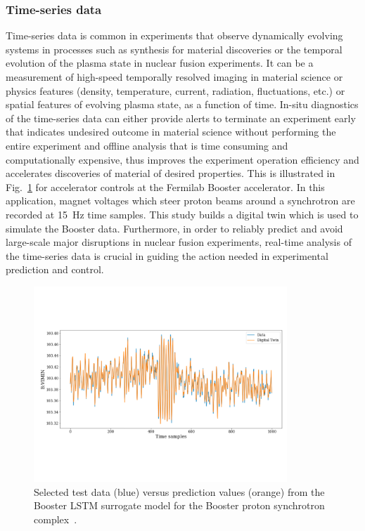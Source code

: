 \subsubsection{Time-series data}
Time-series data is common in experiments that observe dynamically evolving systems in processes such as synthesis for material discoveries or the temporal evolution of the plasma state in nuclear fusion experiments. It can be a measurement of high-speed temporally resolved imaging in material science or physics features (density, temperature, current, radiation, fluctuations, etc.) or spatial features of evolving plasma state, as a function of time. In-situ diagnostics of the time-series data can either provide alerts to terminate an experiment early that indicates undesired outcome in material science without performing the entire experiment and offline analysis that is time consuming and computationally expensive, thus improves the experiment operation efficiency and accelerates discoveries of material of desired properties. This is illustrated in Fig.~\ref{fig:reptime} for accelerator controls at the Fermilab Booster accelerator.  In this application, magnet voltages which steer proton beams around a synchrotron are recorded at 15~Hz time samples.  This study builds a digital twin which is used to simulate the Booster data. Furthermore, in order to reliably predict and avoid large-scale major disruptions in nuclear fusion experiments, real-time analysis of the time-series data is crucial in guiding the action needed in experimental prediction and control.

 \begin{figure}[tbh!]
     \centering
     \includegraphics[width = 0.85\textwidth]{figures/Booster.pdf}
     \caption{Selected test data (blue) versus prediction values (orange) from the Booster LSTM surrogate model for the Booster proton synchrotron complex~\cite{John:2020sak}.}
     \label{fig:reptime}
 \end{figure}
 

